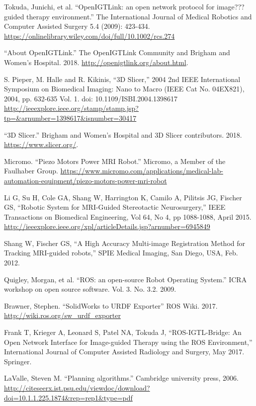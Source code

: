 \documentclass[12pt]{report}
\begin{document}
\begin{thebibliography}{99}
 Tokuda, Junichi, et al. ``OpenIGTLink: an open network protocol for image???guided therapy environment.'' The International Journal of Medical Robotics and Computer Assisted Surgery 5.4 (2009): 423-434. \url{https://onlinelibrary.wiley.com/doi/full/10.1002/rcs.274}

 ``About OpenIGTLink.'' The OpenIGTLink Community and Brigham and Women's Hospital. 2018. \url{http://openigtlink.org/about.html}.

 S. Pieper, M. Halle and R. Kikinis, ``3D Slicer,'' 2004 2nd IEEE International Symposium on Biomedical Imaging: Nano to Macro (IEEE Cat No. 04EX821), 2004, pp. 632-635 Vol. 1. doi: 10.1109/ISBI.2004.1398617 \url{http://ieeexplore.ieee.org/stamp/stamp.jsp?tp=&arnumber=1398617&isnumber=30417}

 ``3D Slicer.'' Brigham and Women's Hospital and 3D Slicer contributors. 2018. \url{https://www.slicer.org/}.

 Micromo. ``Piezo Motors Power MRI Robot.'' Micromo, a Member of the Faulhaber Group.  \url{https://www.micromo.com/applications/medical-lab-automation-equipment/piezo-motors-power-mri-robot}

 Li G, Su H, Cole GA, Shang W, Harrington K, Camilo A, Pilitsis JG, Fischer GS, ``Robotic System for MRI-Guided Stereotactic Neurosurgery,'' IEEE Transactions on Biomedical Engineering, Vol 64, No 4, pp 1088-1088, April 2015. \url{http://ieeexplore.ieee.org/xpl/articleDetails.jsp?arnumber=6945849}

 Shang W, Fischer GS, ``A High Accuracy Multi-image Registration Method for Tracking MRI-guided robots,'' SPIE Medical Imaging, San Diego, USA, Feb. 2012.

 Quigley, Morgan, et al. ``ROS: an open-source Robot Operating System.'' ICRA workshop on open source software. Vol. 3. No. 3.2. 2009.

 Brawner, Stephen. ``SolidWorks to URDF Exporter'' ROS Wiki. 2017. \url{http://wiki.ros.org/sw_urdf_exporter}

 Frank T, Krieger A, Leonard S, Patel NA, Tokuda J, ``ROS-IGTL-Bridge: An Open Network Interface for Image-guided Therapy using the ROS Environment,'' International Journal of Computer Assisted Radiology and Surgery, May 2017. Springer.

 LaValle, Steven M. ``Planning algorithms.'' Cambridge university press, 2006. \url{http://citeseerx.ist.psu.edu/viewdoc/download?doi=10.1.1.225.1874&rep=rep1&type=pdf}


\end{thebibliography}
\end{document}
